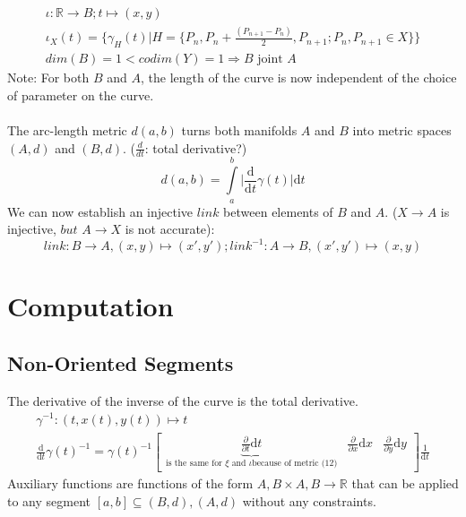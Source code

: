 \documentclass{report}
\begin{document}
\begin{align}
\iota: \mathbb{R} \rightarrow B; t \mapsto (x,y)\\
\iota_{X}(t) = \{ \gamma_{H}(t)\lvert H=\{P_{n},P_{n}+\frac{(P_{n+1}-P_{n})}{2},P_{n+1}; P_{n}, P_{n+1} \in X\}\}\\
dim(B)=1<codim(Y)=1 \Rightarrow B \text{ joint } A
\end{align}
Note: For both $B$ and $A$, the length of the curve is now independent of the choice of parameter on the curve. ~\cite[]{Taimanov}\\\\
The arc-length metric $d(a,b)$ turns both manifolds $A$ and $B$ into metric spaces $(A,d)$ and $(B,d)$. ($\frac{d}{dt}$: total derivative?)
\begin{equation}
d(a,b) = \int \limits _{a}^{b}\lvert \frac{\mathrm{d}}{\mathrm{d}t}\gamma(t)\rvert \mathrm{d}t
\end{equation}
We can now establish an injective $link$ between elements of $B$ and $A$. ($X \rightarrow A$ is injective, $but$ $A \rightarrow X$ is not accurate):
\begin{equation}
link: B \rightarrow A, (x,y) \mapsto (x',y'); link^{-1}: A \rightarrow B, (x',y') \mapsto (x,y)
\end{equation}

\chapter{Computation}

\section{Non-Oriented Segments}
The derivative of the inverse of the curve is the total derivative.
\begin{align}
\gamma^{-1}: (t,x(t),y(t)) \mapsto t\\
\frac{\mathrm{d}}{\mathrm{d} t} \gamma (t)^{-1} = \gamma(t)^{-1} \begin{bmatrix} \underbrace{\frac{\partial}{\partial t} \mathrm{d} t}_{\text{is the same for } \xi \text{ and } \iota \text{because of metric (12)}} & \frac{\partial}{\partial x}  \mathrm{d} x & \frac{\partial}{\partial y} \mathrm{d} y \end{bmatrix} \frac{1}{\mathrm{d}t}
\end{align}
Auxiliary functions are functions of the form $A,B \times A,B \rightarrow \mathbb{R}$ that can be applied to any segment $[a,b] \subseteq (B,d),(A,d)$ without any constraints.
\end{document}
